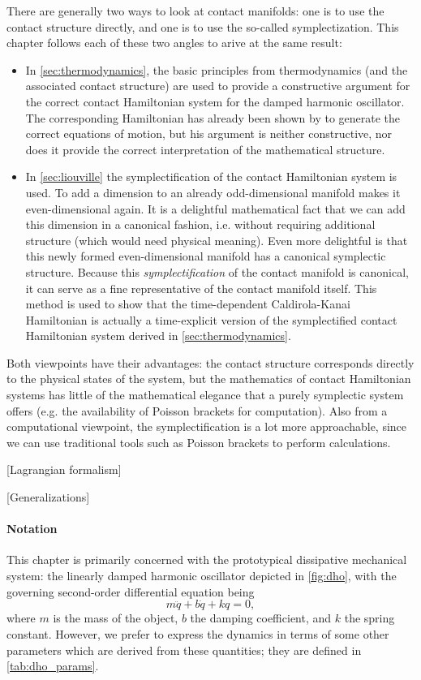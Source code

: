 There are generally two ways to look at contact manifolds: one is to use the contact structure directly, and one is to use the so-called symplectization. This chapter follows each of these two angles to arive at the same result:
\begin{itemize}
    \item In \cref{sec:thermodynamics}, the basic principles from thermodynamics (and the associated contact structure) are used to provide a constructive argument for the correct contact Hamiltonian system for the damped harmonic oscillator. The corresponding Hamiltonian has already been shown by \citet{Bravetti2017} to generate the correct equations of motion, but his argument is neither constructive, nor does it provide the correct interpretation of the mathematical structure.
    \item In \cref{sec:liouville} the symplectification of the contact Hamiltonian system is used. To add a dimension to an already odd-dimensional manifold makes it even-dimensional again. It is a delightful mathematical fact that we can add this dimension in a canonical fashion, i.e. without requiring additional structure (which would need physical meaning). Even more delightful is that this newly formed even-dimensional manifold has a canonical symplectic structure. Because this \emph{symplectification} of the contact manifold is canonical, it can serve as a fine representative of the contact manifold itself. This method is used to show that the time-dependent Caldirola-Kanai Hamiltonian is actually a time-explicit version of the symplectified contact Hamiltonian system derived in \cref{sec:thermodynamics}.
\end{itemize}
Both viewpoints have their advantages: the contact structure corresponds directly to the physical states of the system, but the mathematics of contact Hamiltonian systems has little of the mathematical elegance that a purely symplectic system offers (e.g. the availability of Poisson brackets for computation). Also from a computational viewpoint, the symplectification is a lot more approachable, since we can use traditional tools such as Poisson brackets to perform calculations.

[Lagrangian formalism]

[Generalizations]

\paragraph{Notation} This chapter is primarily concerned with the prototypical dissipative mechanical system: the linearly damped harmonic oscillator depicted in \cref{fig:dho}, with the governing second-order differential equation being
\begin{equation}  
  m\ddot{q} + b\dot{q} + kq = 0,
\end{equation}
where $m$ is the mass of the object, $b$ the damping coefficient, and $k$ the spring constant. However, we prefer to express the dynamics in terms of some other parameters which are derived from these quantities; they are defined in \cref{tab:dho_params}.

